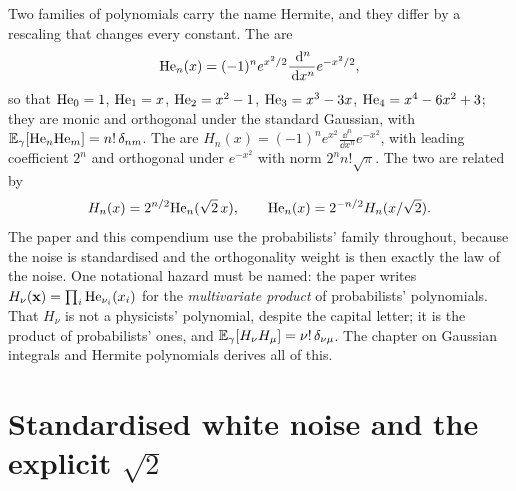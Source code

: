 Two families of polynomials carry the name Hermite, and they differ by a rescaling
that changes every constant. The  are
\begin{equation}
  \mathrm{He}_{n}(x)=(-1)^n e^{x^2/2}\frac{\,\mathrm{d}^n}{\,\mathrm{d} x^n}e^{-x^2/2},
  \label{eq:he-def}
\end{equation}
so that $\mathrm{He}_{0}=1$, $\mathrm{He}_{1}=x$, $\mathrm{He}_{2}=x^2-1$, $\mathrm{He}_{3}=x^3-3x$, $\mathrm{He}_{4}=x^4-6x^2+3$; they are
monic and orthogonal under the standard Gaussian, with $\mathbb{E}_\gamma[\mathrm{He}_{n}\mathrm{He}_{m}]=n!\,\delta_{nm}$.
The  are
$H_n(x)=(-1)^ne^{x^2}\frac{\dd^n}{\dd x^n}e^{-x^2}$, with leading coefficient $2^n$ and
orthogonal under $e^{-x^2}$ with norm $2^nn!\sqrt\pi$. The two are related by
\begin{equation}
  H_n(x)=2^{n/2}\mathrm{He}_{n}(\sqrt2\,x),\qquad \mathrm{He}_{n}(x)=2^{-n/2}H_n(x/\sqrt2).
\end{equation}
The paper and this compendium use the probabilists' family throughout, because the
noise is standardised and the orthogonality weight is then exactly the law of the
noise. One notational hazard must be named: the paper writes $H_\nu(\mathbf{x})=\prod_i\mathrm{He}_{\nu_i}(x_i)$
for the \emph{multivariate product} of probabilists' polynomials. That $H_\nu$ is not
a physicists' polynomial, despite the capital letter; it is the product of
probabilists' ones, and $\mathbb{E}_\gamma[H_\nu H_\mu]=\nu!\,\delta_{\nu\mu}$. The chapter on
Gaussian integrals and Hermite polynomials derives all of this.

\section{Standardised white noise and the explicit $\sqrt2$}

